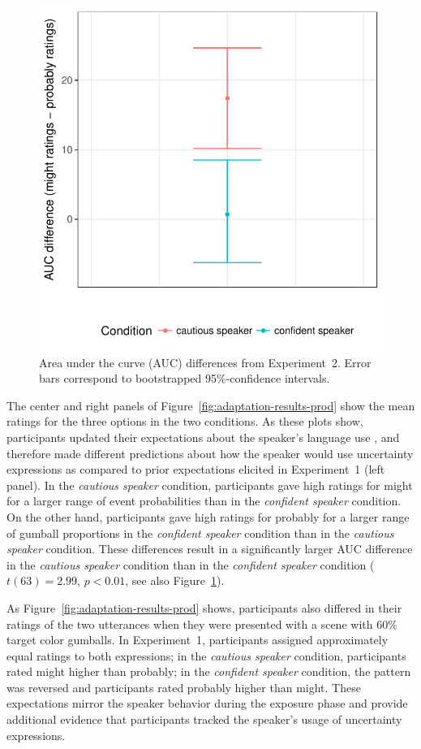 \documentclass[man, floatsintext]{apa6}
\begin{document}
\begin{figure}
\center
\includegraphics[width=.4\textwidth]{plots/exp-1-auc.pdf}
\caption{Area under the curve (AUC) differences from Experiment~2. Error bars correspond to bootstrapped 95\%-confidence intervals.  \label{fig:adaptation-auc-prod}}
\end{figure}

The center and right panels of Figure~\ref{fig:adaptation-results-prod} show the mean ratings for the three options in the two conditions. As these plots show, participants updated their expectations about the speaker's language use , and therefore made different predictions about how the speaker would use uncertainty expressions as compared to prior expectations elicited in Experiment~1 (left panel). In the \emph{cautious speaker} condition, participants gave high ratings for {\sc might} for a larger range of event probabilities than in the \emph{confident speaker} condition. On the other hand, participants gave high ratings for {\sc probably} for a larger range of gumball proportions in the \emph{confident speaker} condition than in the \emph{cautious speaker} condition. These differences result in a significantly larger AUC difference in the \emph{cautious speaker} condition than in the \emph{confident speaker} condition ($t(63) = 2.99$, $p < 0.01$, see also Figure~\ref{fig:adaptation-auc-prod}).

As Figure~\ref{fig:adaptation-results-prod} shows, participants also differed in their ratings of the two utterances when they were presented with a scene with 60\% target color gumballs. In Experiment~1, participants assigned approximately equal ratings to both expressions; in the \emph{cautious speaker} condition, participants rated {\sc might} higher than {\sc probably}; in the \emph{confident speaker} condition, the pattern was reversed and participants rated {\sc probably} higher than {\sc might}. These expectations mirror the speaker behavior during the exposure phase and provide additional evidence that participants tracked the speaker's usage of uncertainty expressions. 
\end{document}
